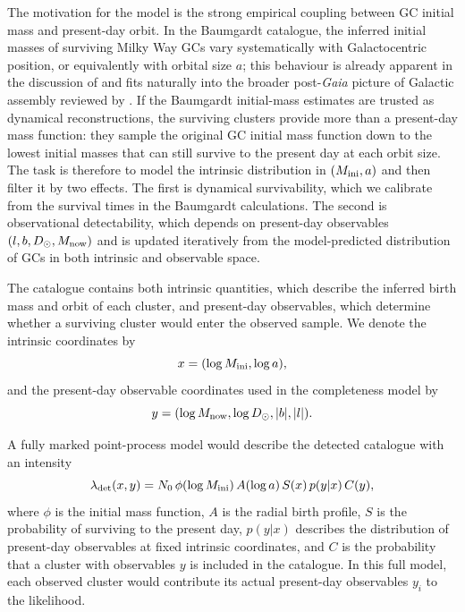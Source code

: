 \documentclass[fleqn,usenatbib]{mnras}
\begin{document}
The motivation for the model is the strong empirical coupling between GC initial mass and present-day orbit. In the Baumgardt catalogue, the inferred initial masses of surviving Milky Way GCs vary systematically with Galactocentric position, or equivalently with orbital size $a$; this behaviour is already apparent in the discussion of \citet{Baumgardt2019} and fits naturally into the broader post-\textit{Gaia} picture of Galactic assembly reviewed by \citet{DeasonBelokurov2024}. If the Baumgardt initial-mass estimates are trusted as dynamical reconstructions, the surviving clusters provide more than a present-day mass function: they sample the original GC initial mass function down to the lowest initial masses that can still survive to the present day at each orbit size. The task is therefore to model the intrinsic distribution in $(M_{\rm ini},a)$ and then filter it by two effects. The first is dynamical survivability, which we calibrate from the survival times in the Baumgardt calculations. The second is observational detectability, which depends on present-day observables $(l,b,D_\odot,M_{\rm now})$ and is updated iteratively from the model-predicted distribution of GCs in both intrinsic and observable space.

The catalogue contains both intrinsic quantities, which describe the inferred birth mass and orbit of each cluster, and present-day observables, which determine whether a surviving cluster would enter the observed sample. We denote the intrinsic coordinates by
\begin{equation}
x=(\log M_{\rm ini}, \log a),
\end{equation}
and the present-day observable coordinates used in the completeness model by
\begin{equation}
y=(\log M_{\rm now}, \log D_\odot, |b|, |l|).
\end{equation}

A fully marked point-process model would describe the detected catalogue with an intensity
\begin{equation}
\lambda_{\rm det}(x,y)
=
N_0\,\phi(\log M_{\rm ini})\,A(\log a)\,
S(x)\,p(y|x)\,C(y),
\end{equation}
where $\phi$ is the initial mass function, $A$ is the radial birth profile, $S$ is the probability of surviving to the present day, $p(y|x)$ describes the distribution of present-day observables at fixed intrinsic coordinates, and $C$ is the probability that a cluster with observables $y$ is included in the catalogue. In this full model, each observed cluster would contribute its actual present-day observables $y_i$ to the likelihood.
\end{document}
